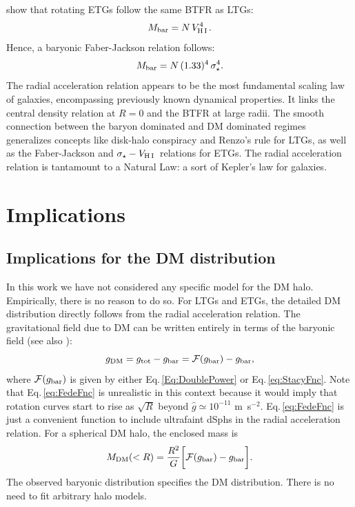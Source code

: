 \documentclass[apjl, twocolappendix]{emulateapj}
\newcommand{\hi } {{\rm H}\,{\small\rm I} \,}
\begin{document}
\citet{denHeijer2015} show that rotating ETGs follow the same BTFR as LTGs: 
\begin{equation}
M_{\rm bar} = N \, V_{\hi}^4.
\end{equation}
Hence, a baryonic Faber-Jackson relation follows:
\begin{equation}
M_{\rm bar} = N \, (1.33)^4 \, \sigma_{\star}^4. 
\end{equation}
The radial acceleration relation appears to be the most fundamental scaling law of galaxies, encompassing previously known dynamical properties. It links the central density relation at $R=0$ and the BTFR at large radii. The smooth connection between the baryon dominated and DM dominated regimes generalizes concepts like disk-halo conspiracy and Renzo's rule for LTGs, as well as the Faber-Jackson and $\sigma_{\star}-V_{\hi}$ relations for ETGs. The radial acceleration relation is tantamount to a Natural Law: a sort of Kepler's law for galaxies.

\section{Implications}\label{sec:Impl}

\subsection{Implications for the DM distribution}

In this work we have not considered any specific model for the DM halo. Empirically, there is no reason to do so. For LTGs and ETGs, the detailed DM distribution directly follows from the radial acceleration relation. The gravitational field due to DM can be written entirely in terms of the baryonic field (see also \citealt{McGaugh2004}):
\begin{equation}\label{Eq:DMforce}
 g_{\rm DM} = g_{\rm tot} - g_{\rm bar} = \mathcal{F}(g_{\rm bar}) - g_{\rm bar},
\end{equation}
where $\mathcal{F}(g_{\rm bar})$ is given by either Eq.\,\ref{Eq:DoublePower} or Eq.\,\ref{eq:StacyFnc}. Note that Eq.\,\ref{eq:FedeFnc} is unrealistic in this context because it would imply that rotation curves start to rise as $\sqrt{R}$ beyond $\hat{g} \simeq 10^{-11}$ m~s$^{-2}$. Eq.\,\ref{eq:FedeFnc} is just a convenient function to include ultrafaint dSphs in the radial acceleration relation. For a spherical DM halo, the enclosed mass is
\begin{equation}\label{Eq:DMmass}
 M_{\rm DM}(< R) = \dfrac{R^2}{G} \bigg[\mathcal{F}(g_{\rm bar})- g_{\rm bar}\bigg].
\end{equation}
The observed baryonic distribution specifies the DM distribution. There is no need to fit arbitrary halo models.
\end{document}
